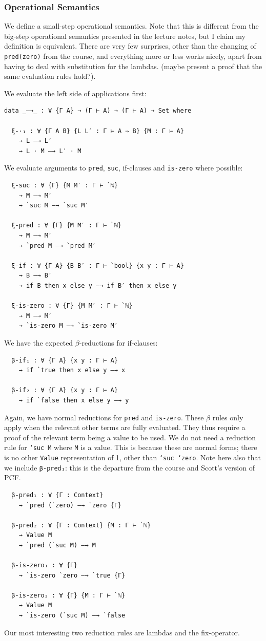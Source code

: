 \documentclass[12pt,a4paper,twoside,openright]{report}
\begin{document}
\subsubsection{Operational Semantics}
We define a small-step operational semantics. Note that this is different from the big-step operational semantics presented in the lecture notes, but I claim my definition is equivalent. There are very few surprises, other than the changing of \texttt{pred(zero)} from the course, and everything more or less works nicely, apart from having to deal with substitution for the lambdas. (maybe present a proof that the same evaluation rules hold?). 

We evaluate the left side of applications first:
\begin{verbatim}
data _—→_ : ∀ {Γ A} → (Γ ⊢ A) → (Γ ⊢ A) → Set where

  ξ-·₁ : ∀ {Γ A B} {L L′ : Γ ⊢ A ⇒ B} {M : Γ ⊢ A}
    → L —→ L′
    → L · M —→ L′ · M
\end{verbatim}
We evaluate arguments to \texttt{pred}, \texttt{suc}, if-clauses and \texttt{is-zero} where possible:
\begin{verbatim}
  ξ-suc : ∀ {Γ} {M M′ : Γ ⊢ `ℕ}
    → M —→ M′
    → `suc M —→ `suc M′

  ξ-pred : ∀ {Γ} {M M′ : Γ ⊢ `ℕ}
    → M —→ M′
    → `pred M —→ `pred M′
  
  ξ-if : ∀ {Γ A} {B B′ : Γ ⊢ `bool} {x y : Γ ⊢ A}
    → B —→ B′
    → if B then x else y —→ if B′ then x else y

  ξ-is-zero : ∀ {Γ} {M M′ : Γ ⊢ `ℕ}
    → M —→ M′
    → `is-zero M —→ `is-zero M′
\end{verbatim}
We have the expected $\beta$-reductions for if-clauses:
\begin{verbatim}
  β-if₁ : ∀ {Γ A} {x y : Γ ⊢ A}
    → if `true then x else y —→ x

  β-if₂ : ∀ {Γ A} {x y : Γ ⊢ A}
    → if `false then x else y —→ y
\end{verbatim}
Again, we have normal reductions for \texttt{pred} and \texttt{is-zero}. These $\beta$ rules only apply when the relevant other terms are fully evaluated. They thus require a proof of the relevant term being a value to be used. We do not need a reduction rule for \texttt{`suc M} where \texttt{M} is a value. This is because these are normal forms; there is no other \texttt{Value} representation of 1, other than \texttt{`suc `zero}. Note here also that we include \texttt{β-pred₁}: this is the departure from the course and Scott's version of PCF. 
\begin{verbatim}
  β-pred₁ : ∀ {Γ : Context}
    → `pred (`zero) —→ `zero {Γ}

  β-pred₂ : ∀ {Γ : Context} {M : Γ ⊢ `ℕ}
    → Value M
    → `pred (`suc M) —→ M

  β-is-zero₁ : ∀ {Γ}
    → `is-zero `zero —→ `true {Γ}

  β-is-zero₂ : ∀ {Γ} {M : Γ ⊢ `ℕ}
    → Value M
    → `is-zero (`suc M) —→ `false 
\end{verbatim}
Our most interesting two reduction rules are lambdas and the fix-operator. 
\end{document}
